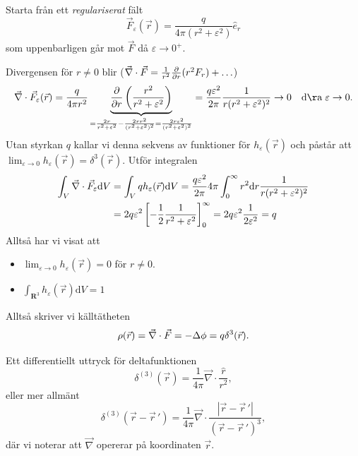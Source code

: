 \documentclass[%
oneside,                 %
final,                   %
10pt]{article}
\begin{document}
Starta från ett \emph{regulariserat} fält
\begin{equation}
\vec{F}_\varepsilon(\vec{r}) = \frac{q}{4 \pi (r^2 + \varepsilon^2)} \hat{e}_r
\end{equation}
som uppenbarligen går mot $\vec{F}$ då $\varepsilon \to 0^+$.

Divergensen för $r \neq 0$ blir ($\vec{\nabla} \cdot \vec{F} = \frac{1}{r^2} \frac{\partial}{\partial r} (r^2 F_r) + \ldots$)
\begin{equation}
\vnabla \cdot \vec{F}_\varepsilon(\vec{r}) = \frac{q}{4 \pi r^2} \underbrace{\frac{\partial}{\partial r} \left( \frac{r^2}{r^2 + \varepsilon^2} \right)}_{=\frac{2r}{r^2 + \varepsilon^2} - \frac{2 r r^2}{(r^2 + \varepsilon^2)^2} = \frac{2 r \varepsilon^2}{(r^2 + \varepsilon^2)^2}}
= \frac{q \varepsilon^2}{2 \pi} \frac{1}{r(r^2 + \varepsilon^2)^2} \to 0 \quad \mathrm{då} \; \varepsilon \to 0.
\end{equation}
Utan styrkan $q$ kallar vi denna sekvens av funktioner för $h_\varepsilon(\vec{r})$ och påstår att $\lim_{\varepsilon \to 0} h_\varepsilon(\vec{r}) = \delta^3(\vec{r})$. Utför integralen
\begin{align}
\int_V \vec{\nabla} \cdot \vec{F}_\varepsilon \mbox{d} V &= \int_V q h_\varepsilon(\vec{r}) \mbox{d} V = \frac{ q \varepsilon^2}{2 \pi} 4\pi \int_0^\infty r^2 \mbox{d} r \frac{1}{r(r^2 + \varepsilon^2)^2} \\ 
&= 2 q \varepsilon^2 \left[ -\frac{1}{2} \frac{1}{r^2 + \varepsilon^2} \right]_0^\infty = 2 q \varepsilon^2 \frac{1}{2 \varepsilon^2} = q
\end{align}
Alltså har vi visat att
\begin{itemize}
\item $\lim_{\varepsilon \to 0} h_\varepsilon(\vec{r}) = 0$ för $r \neq 0$.

\item $\int_{\mathbf{R}^3} h_\varepsilon(\vec{r}) \mbox{d}V = 1$
\end{itemize}

\noindent
Alltså skriver vi källtätheten 
$$
\rho(\vec{r}) = \vec{\nabla} \cdot \vec{F} = -\Delta \phi = q \delta^3(\vec{r}).
$$

Ett differentiellt uttryck för deltafunktionen
\[
\delta^{(3)} \left( \vec{r} \right) 
= \frac{1}{4\pi} \vec{\nabla} \cdot \frac{\hat{r}}{r^2},
\]
eller mer allmänt
\[
\delta^{(3)} \left( \vec{r} - \vec{r}\,' \right) 
= \frac{1}{4\pi} \vec{\nabla} \cdot 
\frac{ \left| \vec{r} - \vec{r}\,' \right|}{\left( \vec{r} - \vec{r}\,' \right)^3 },
\]
där vi noterar att $\vec{\nabla}$ opererar på koordinaten $\vec{r}$.
\end{document}
